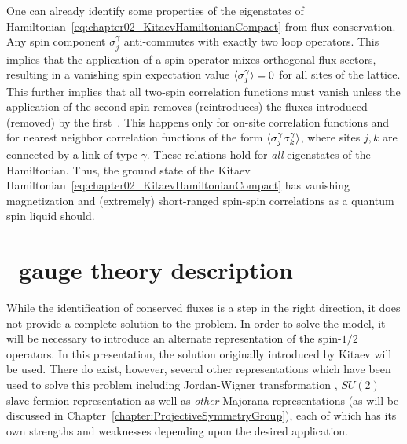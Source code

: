 One can already identify some properties of the eigenstates of Hamiltonian~\eqref{eq:chapter02_KitaevHamiltonianCompact} from flux conservation.
Any spin component $\sigma_j^{\gamma}$ anti-commutes with exactly two loop operators.
This implies that the application of a spin operator mixes orthogonal flux sectors, resulting in a vanishing spin expectation value $\langle \sigma_j^{\gamma} \rangle = 0$ for all sites of the lattice.
This further implies that all two-spin correlation functions must vanish unless the application of the second spin removes (reintroduces) the fluxes introduced (removed) by the first~\cite{BaskaranPRL2007}.
This happens only for on-site correlation functions and for nearest neighbor correlation functions of the form $\langle \sigma_j^{\gamma} \sigma_k^{\gamma} \rangle$, where sites $j, k$ are connected by a link of type $\gamma$.
These relations hold for \textit{all} eigenstates of the Hamiltonian.
Thus, the ground state of the Kitaev Hamiltonian~\eqref{eq:chapter02_KitaevHamiltonianCompact} has vanishing magnetization and (extremely) short-ranged spin-spin correlations as a quantum spin liquid should.


%
%
\section{\texorpdfstring{\ZZ}{Z2}~gauge theory description}
\label{section:chapter02_Z2GaugeTheory}
%
%
While the identification of conserved fluxes is a step in the right direction, it does not provide a complete solution to the problem.
In order to solve the model, it will be necessary to introduce an alternate representation of the spin-$1/2$ operators.
In this presentation, the solution originally introduced by Kitaev \cite{KitaevAoP2006} will be used.
There do exist, however, several other representations which have been used to solve this problem including Jordan-Wigner transformation \cite{FengPRL2007}, $SU(2)$ slave fermion representation \cite{BurnellPRB2011} as well as \textit{other} Majorana representations \cite{Tsvelik2003,YouPRB2012,SeifertPRBFeb2018,SeifertPRBOct2018} (as will be discussed in Chapter~\ref{chapter:ProjectiveSymmetryGroup}), each of which has its own strengths and weaknesses depending upon the desired application.

